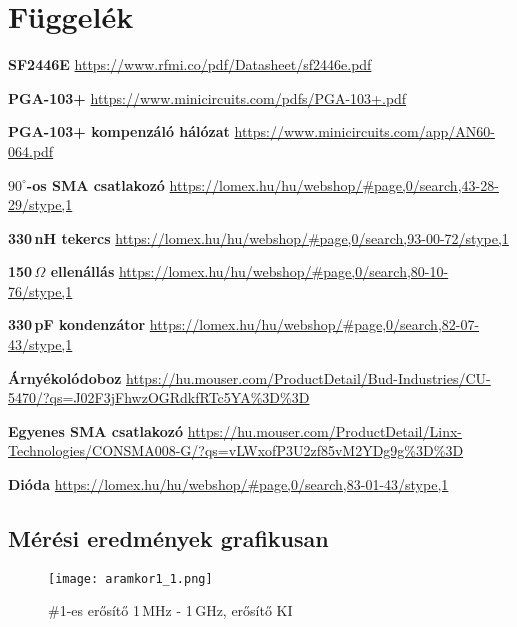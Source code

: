 \section{Függelék}
\label{sec:fuggelek}

\begin{thebibliography}{1}
	
	 \textbf{SF2446E} \url{https://www.rfmi.co/pdf/Datasheet/sf2446e.pdf}
	
	 \textbf{PGA-103+} \url{https://www.minicircuits.com/pdfs/PGA-103+.pdf}
	
	 \textbf{PGA-103+ kompenzáló hálózat} \url{https://www.minicircuits.com/app/AN60-064.pdf}
	
	 \textbf{$90^{\circ}$-os SMA csatlakozó}
	\url{https://lomex.hu/hu/webshop/#page,0/search,43-28-29/stype,1}
	
	 \textbf{330\,nH tekercs}
	\url{https://lomex.hu/hu/webshop/#page,0/search,93-00-72/stype,1}
	
	 \textbf{150\,$\Omega$ ellenállás}
	\url{https://lomex.hu/hu/webshop/#page,0/search,80-10-76/stype,1}
	
	 \textbf{330\,pF kondenzátor}
	\url{https://lomex.hu/hu/webshop/#page,0/search,82-07-43/stype,1}
	
	 \textbf{Árnyékolódoboz}
	\url{https://hu.mouser.com/ProductDetail/Bud-Industries/CU-5470/?qs=J02F3jFhwzOGRdkfRTc5YA%3D%3D}
	
	 \textbf{Egyenes SMA csatlakozó}
	\url{https://hu.mouser.com/ProductDetail/Linx-Technologies/CONSMA008-G/?qs=vLWxofP3U2zf85vM2YDg9g%3D%3D}
	
	 \textbf{Dióda}
	\url{https://lomex.hu/hu/webshop/#page,0/search,83-01-43/stype,1}


\end{thebibliography}

\newpage

\subsection{Mérési eredmények grafikusan}

\begin{figure}[!ht]
	\centering
	\texttt{[image: aramkor1\_1.png]}
	\caption{\#1-es erősítő 1\,MHz - 1\,GHz, erősítő KI}
	\label{fig:meres1}
\end{figure}

